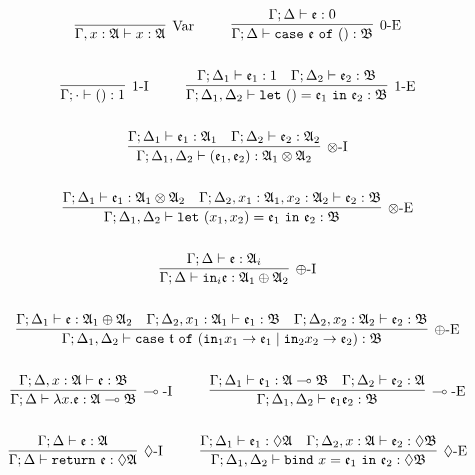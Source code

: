 \begin{gather*}
\infer[\mbox{Var}]{\Gamma, x: \A \vdash x : \A}{}
~~~~ ~~~~
\infer[0\mbox{-E}]{\Gamma; \Delta \vdash \mathtt{case}~\e~\mathtt{of}~() : \mathfrak{B}}{\Gamma; \Delta \vdash \e : 0}
\\ \\ 
\infer[1\mbox{-I}]{\Gamma; \cdot \vdash () : 1}{}
~~~~ ~~~~
\infer[1\mbox{-E}]{\Gamma; \Delta_1, \Delta_2 \vdash \mathtt{let}~() = \e_1~\mathtt{in}~\e_2 : \mathfrak{B}}{
    \Gamma; \Delta_1 \vdash \e_1 : 1
    &
    \Gamma; \Delta_2 \vdash \e_2 : \mathfrak{B}
}
\\ \\ 
\infer[\otimes\mbox{-I}]{\Gamma; \Delta_1, \Delta_2 \vdash (\e_1, \e_2) : \A_1 \otimes \A_2}{
    \Gamma; \Delta_1 \vdash \e_1 : \A_1
    &
    \Gamma; \Delta_2 \vdash \e_2 : \A_2
}
\\ \\ 
\infer[\otimes\mbox{-E}]{\Gamma; \Delta_1, \Delta_2 \vdash \mathtt{let}~(x_1, x_2) = \e_1~\mathtt{in}~\e_2 : \mathfrak{B}}{
    \Gamma; \Delta_1 \vdash \e_1 : \A_1 \otimes \A_2
    &
    \Gamma; \Delta_2, x_1 : \A_1, x_2 : \A_2 \vdash \e_2 : \mathfrak{B}
}
\\ \\ 
\infer[\oplus\mbox{-I}]{\Gamma; \Delta \vdash \mathtt{in}_i \e : \A_1 \oplus \A_2}{\Gamma; \Delta \vdash \e : \A_i}
\\ \\
\infer[\oplus\mbox{-E}]{\Gamma; \Delta_1, \Delta_2 \vdash \mathtt{case}~\t~\mathtt{of}~(\mathtt{in}_1 x_1 \rightarrow \e_1 \mid \mathtt{in}_2 x_2 \rightarrow \e_2) : \mathfrak{B}}{
    \Gamma; \Delta_1 \vdash \e : \A_1 \oplus \A_2
    &
    \Gamma; \Delta_2, x_1 : \A_1 \vdash \e_1 : \mathfrak{B}
    &
    \Gamma; \Delta_2, x_2 : \A_2 \vdash \e_2 : \mathfrak{B}
}
\\ \\ 
\infer[\multimap\mbox{-I}]{\Gamma; \Delta \vdash \lambda x. \e : \A \multimap \mathfrak{B}}{\Gamma; \Delta, x : \A \vdash \e : \mathfrak{B}}
~~~~ ~~~~
\infer[\multimap\mbox{-E}]{\Gamma; \Delta_1, \Delta_2 \vdash \e_1\e_2 : \mathfrak{B}}{
    \Gamma; \Delta_1 \vdash \e_1 : \A \multimap \mathfrak{B}
    &
    \Gamma; \Delta_2 \vdash \e_2 : \A
}
\\ \\ 
\infer[\diamond\mbox{-I}]{\Gamma; \Delta \vdash \mathtt{return}~\e : \diamond\A}{\Gamma; \Delta \vdash \e : \A}
~~~~ ~~~~
\infer[\diamond\mbox{-E}]{\Gamma; \Delta_1, \Delta_2 \vdash \mathtt{bind}~x = \e_1~\mathtt{in}~\e_2 : \diamond\mathfrak{B}}{
    \Gamma; \Delta_1 \vdash \e_1 : \diamond\A
    &
    \Gamma; \Delta_2, x : \A \vdash \e_2 : \diamond\mathfrak{B}
}
\end{gather*}